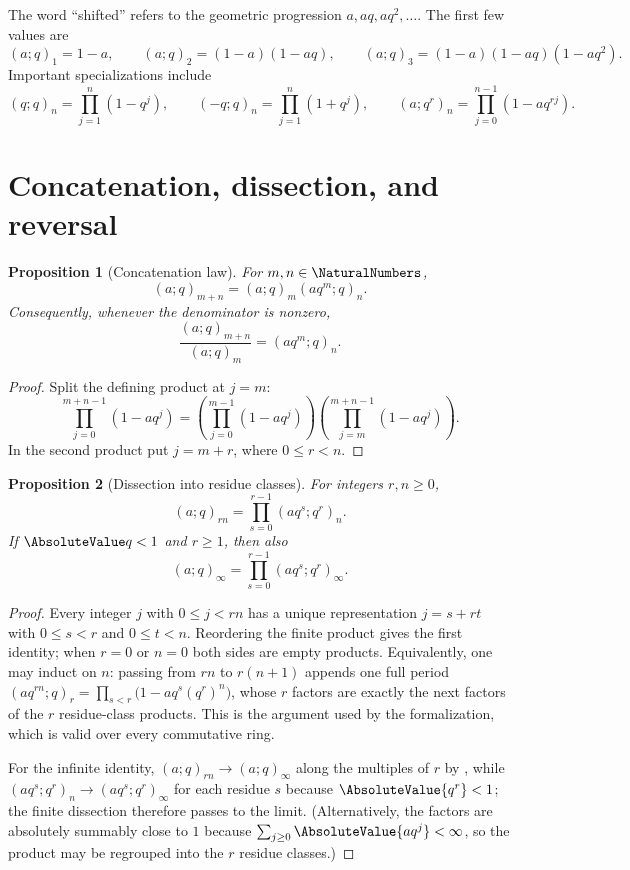\documentclass[11pt,a4paper,oneside,openany]{book}
\newtheorem{proposition}[proposition]{Proposition}
\theoremstyle{definition}
\theoremstyle{remark}
\begin{document}
The word ``shifted'' refers to the geometric progression $a,aq,aq^2,\ldots$.  The first few values are
\[
 (a;q)_1=1-a,
 \qquad
 (a;q)_2=(1-a)(1-aq),
 \qquad
 (a;q)_3=(1-a)(1-aq)(1-aq^2).
\]
Important specializations include
\[
 (q;q)_n=\prod_{j=1}^n(1-q^j),
 \qquad
 (-q;q)_n=\prod_{j=1}^n(1+q^j),
 \qquad
 (a;q^r)_n=\prod_{j=0}^{n-1}(1-aq^{rj}).
\]

\section{Concatenation, dissection, and reversal}

\begin{proposition}[Concatenation law]\label{prop:concat}
For $m,n\in\NaturalNumbers$,
\[
 (a;q)_{m+n}=(a;q)_m(aq^m;q)_n.
\]
Consequently, whenever the denominator is nonzero,
\[
 \frac{(a;q)_{m+n}}{(a;q)_m}=(aq^m;q)_n.
\]
\end{proposition}

\begin{proof}
Split the defining product at $j=m$:
\[
 \prod_{j=0}^{m+n-1}(1-aq^j)
 =\left(\prod_{j=0}^{m-1}(1-aq^j)\right)
  \left(\prod_{j=m}^{m+n-1}(1-aq^j)\right).
\]
In the second product put $j=m+r$, where $0\le r<n$.
\end{proof}

\begin{proposition}[Dissection into residue classes]\label{prop:dissection}
For integers $r,n\ge0$,
\[
 (a;q)_{rn}=\prod_{s=0}^{r-1}(aq^s;q^r)_n.
\]
If $\AbsoluteValue q<1$ and $r\ge1$, then also
\[
 (a;q)_\infty=\prod_{s=0}^{r-1}(aq^s;q^r)_\infty.
\]
\end{proposition}

\begin{proof}
Every integer $j$ with $0\le j<rn$ has a unique representation $j=s+rt$ with $0\le s<r$ and $0\le t<n$.  Reordering the finite product gives the first identity; when $r=0$ or $n=0$ both sides are empty products.  Equivalently, one may induct on $n$: passing from $rn$ to $r(n+1)$ appends one full period $(aq^{rn};q)_r=\prod_{s<r}\bigl(1-aq^{s}(q^r)^{n}\bigr)$, whose $r$ factors are exactly the next factors of the $r$ residue-class products.  This is the argument used by the formalization, which is valid over every commutative ring.

For the infinite identity, $(a;q)_{rn}\to(a;q)_\infty$ along the multiples of $r$ by , while $(aq^s;q^r)_n\to(aq^s;q^r)_\infty$ for each residue $s$ because $\AbsoluteValue{q^r}<1$; the finite dissection therefore passes to the limit.  (Alternatively, the factors are absolutely summably close to $1$ because $\sum_{j\ge0}\AbsoluteValue{aq^j}<\infty$, so the product may be regrouped into the $r$ residue classes.)
\end{proof}
\end{document}
